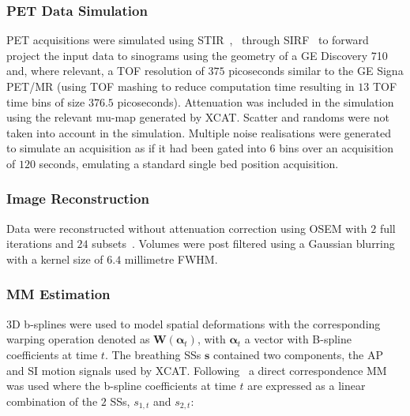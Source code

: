            \subsubsection{PET Data Simulation} \label{impact_of_tof_on_respiratory_motion_modelling_using_nac_pet_methods_pet_data_simulation}
                \gls{PET} acquisitions were simulated using \gls{STIR}~,~ through \gls{SIRF}~ to forward project the input data to sinograms using the geometry of a GE Discovery 710 and, where relevant, a \gls{TOF} resolution of $375$ picoseconds similar to the GE Signa \gls{PET}/\gls{MR} (using \gls{TOF} mashing to reduce computation time resulting in $13$ \gls{TOF} time bins of size $376.5$ picoseconds). Attenuation was included in the simulation using the relevant \gls{mu-map} generated by \gls{XCAT}. Scatter and randoms were not taken into account in the simulation. Multiple noise realisations were generated to simulate an acquisition as if it had been gated into $6$ bins over an acquisition of $120$ seconds, emulating a standard single bed position acquisition. 
            
            \subsubsection{Image Reconstruction} \label{impact_of_tof_on_respiratory_motion_modelling_using_nac_pet_methods_image_reconstruction}
                Data were reconstructed without attenuation correction using \gls{OSEM} with $2$ full iterations and $24$ subsets~. Volumes were post filtered using a Gaussian blurring with a kernel size of $6.4$ millimetre \gls{FWHM}.
            
            \subsubsection{\gls{MM} Estimation} \label{impact_of_tof_on_respiratory_motion_modelling_using_nac_pet_methods_motion_model_estimation}
                \gls{3D} b-splines were used to model spatial deformations with the corresponding warping operation denoted as $\mathbf{W}(\mathbf{\alpha}_t)$, with $\mathbf{\alpha}_t$ a vector with B-spline coefficients at time $t$. The breathing \gls{SS}s $\mathbf{s}$ contained two components, the \gls{AP} and \gls{SI} motion signals used by \gls{XCAT}. Following~ a direct correspondence \gls{MM} was used where the b-spline coefficients at time $t$ are expressed as a linear combination of the $2$ \gls{SS}s, $s_{1,t}$ and $s_{2,t}$:
            
